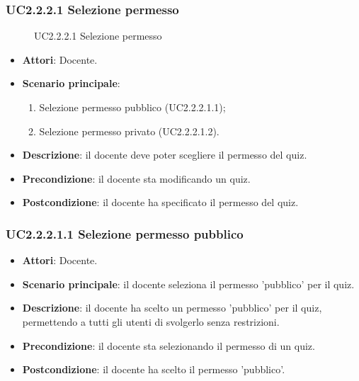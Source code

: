 \subsubsection{UC2.2.2.1 Selezione permesso}
\begin{figure}[H]
\centering
\noindent{}
\caption{UC2.2.2.1 Selezione permesso}
\end{figure}
\begin{itemize}
\item \textbf{Attori}: Docente.
\item \textbf{Scenario principale}:
\begin{enumerate}
\item Selezione permesso pubblico (UC2.2.2.1.1);
\item Selezione permesso privato (UC2.2.2.1.2).
\end{enumerate}
\item \textbf{Descrizione}: il docente deve poter scegliere il permesso del quiz.
\item \textbf{Precondizione}: il docente sta modificando un quiz.
\item \textbf{Postcondizione}: il docente ha specificato il permesso del quiz.
\end{itemize}
\subsubsection{UC2.2.2.1.1 Selezione permesso pubblico}
\begin{itemize}
\item \textbf{Attori}: Docente.
\item \textbf{Scenario principale}: il docente seleziona il permesso 'pubblico' per il quiz.
\item \textbf{Descrizione}: il docente ha scelto un permesso 'pubblico' per il quiz, permettendo a tutti gli utenti di svolgerlo senza restrizioni.
\item \textbf{Precondizione}: il docente sta selezionando il permesso di un quiz.
\item \textbf{Postcondizione}: il docente ha scelto il permesso 'pubblico'.
\end{itemize}
